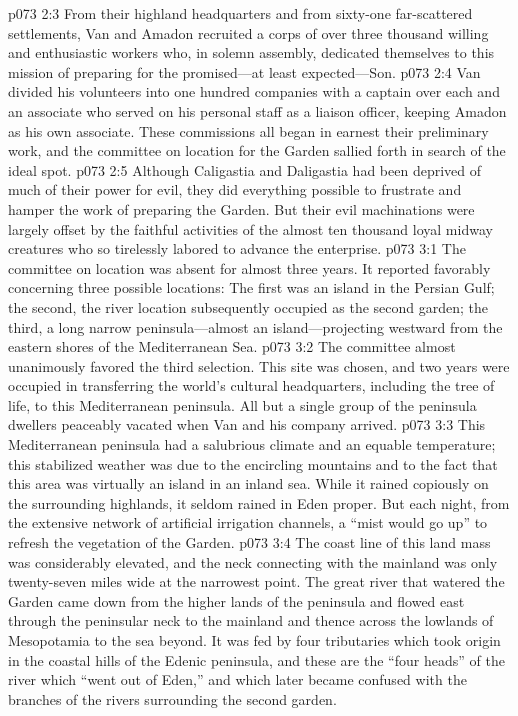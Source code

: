 \vs p073 2:3 From their highland headquarters and from sixty\hyp{}one far\hyp{}scattered settlements, Van and Amadon recruited a corps of over three thousand willing and enthusiastic workers who, in solemn assembly, dedicated themselves to this mission of preparing for the promised---at least expected---Son.
\vs p073 2:4 Van divided his volunteers into one hundred companies with a captain over each and an associate who served on his personal staff as a liaison officer, keeping Amadon as his own associate. These commissions all began in earnest their preliminary work, and the committee on location for the Garden sallied forth in search of the ideal spot.
\pc \vs p073 2:5 Although Caligastia and Daligastia had been deprived of much of their power for evil, they did everything possible to frustrate and hamper the work of preparing the Garden. But their evil machinations were largely offset by the faithful activities of the almost ten thousand loyal midway creatures who so tirelessly labored to advance the enterprise.
\vs p073 3:1 The committee on location was absent for almost three years. It reported favorably concerning three possible locations: The first was an island in the Persian Gulf; the second, the river location subsequently occupied as the second garden; the third, a long narrow peninsula---almost an island---projecting westward from the eastern shores of the Mediterranean Sea.
\vs p073 3:2 The committee almost unanimously favored the third selection. This site was chosen, and two years were occupied in transferring the world’s cultural headquarters, including the tree of life, to this Mediterranean peninsula. All but a single group of the peninsula dwellers peaceably vacated when Van and his company arrived.
\pc \vs p073 3:3 This Mediterranean peninsula had a salubrious climate and an equable temperature; this stabilized weather was due to the encircling mountains and to the fact that this area was virtually an island in an inland sea. While it rained copiously on the surrounding highlands, it seldom rained in Eden proper. But each night, from the extensive network of artificial irrigation channels, a “mist would go up” to refresh the vegetation of the Garden.
\vs p073 3:4 The coast line of this land mass was considerably elevated, and the neck connecting with the mainland was only twenty\hyp{}seven miles wide at the narrowest point. The great river that watered the Garden came down from the higher lands of the peninsula and flowed east through the peninsular neck to the mainland and thence across the lowlands of Mesopotamia to the sea beyond. It was fed by four tributaries which took origin in the coastal hills of the Edenic peninsula, and these are the “four heads” of the river which “went out of Eden,” and which later became confused with the branches of the rivers surrounding the second garden.
